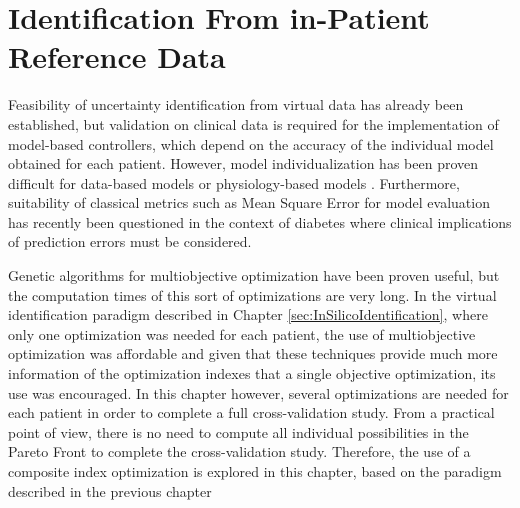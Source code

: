 
\chapter{Identification From in-Patient Reference Data}
\label{sec:PilotExperimentalIdentification}


Feasibility of uncertainty identification from virtual data has already been established, but validation on clinical data is required for the implementation of model-based controllers, which depend on the accuracy of the individual model obtained for each patient. However, model individualization has been proven difficult for data-based models \cite{stahl2009diabetes,percival2010modeling,finan2009experimental} or physiology-based models \cite{palerm2006robust}. Furthermore, suitability of classical metrics such as Mean Square Error for model evaluation has recently been questioned in the context of diabetes \cite{del2012glucose} where clinical implications of prediction errors must be considered.

Genetic algorithms for multiobjective optimization have been proven useful, but the computation times of this sort of optimizations are very long. In the virtual identification paradigm described in Chapter \ref{sec:InSilicoIdentification}, where only one optimization was needed for each patient, the use of multiobjective optimization was affordable and given that these techniques provide much more information of the optimization indexes that a single objective optimization, its use was encouraged. In this chapter however, several optimizations are needed for each patient in order to complete a full cross-validation study. From a practical point of view, there is no need to compute all individual possibilities in the Pareto Front to complete the cross-validation study. Therefore, the use of a composite index optimization is explored in this chapter, based on the paradigm described in the previous chapter



